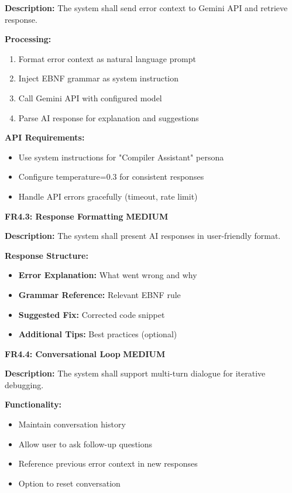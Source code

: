 \documentclass[a4paper,11pt]{article}
\newcommand{\priority}[1]{\colorbox{red!20}{\textbf{#1}}}
\begin{document}
\textbf{Description:} The system shall send error context to Gemini API and retrieve response.

\textbf{Processing:}
\begin{enumerate}
    \item Format error context as natural language prompt
    \item Inject EBNF grammar as system instruction
    \item Call Gemini API with configured model
    \item Parse AI response for explanation and suggestions
\end{enumerate}

\textbf{API Requirements:}
\begin{itemize}
    \item Use system instructions for "Compiler Assistant" persona
    \item Configure temperature=0.3 for consistent responses
    \item Handle API errors gracefully (timeout, rate limit)
\end{itemize}

\vspace{3mm}
\textbf{FR4.3: Response Formatting} \priority{MEDIUM}

\textbf{Description:} The system shall present AI responses in user-friendly format.

\textbf{Response Structure:}
\begin{itemize}
    \item \textbf{Error Explanation:} What went wrong and why
    \item \textbf{Grammar Reference:} Relevant EBNF rule
    \item \textbf{Suggested Fix:} Corrected code snippet
    \item \textbf{Additional Tips:} Best practices (optional)
\end{itemize}

\vspace{3mm}
\textbf{FR4.4: Conversational Loop} \priority{MEDIUM}

\textbf{Description:} The system shall support multi-turn dialogue for iterative debugging.

\textbf{Functionality:}
\begin{itemize}
    \item Maintain conversation history
    \item Allow user to ask follow-up questions
    \item Reference previous error context in new responses
    \item Option to reset conversation
\end{itemize}
\end{document}
